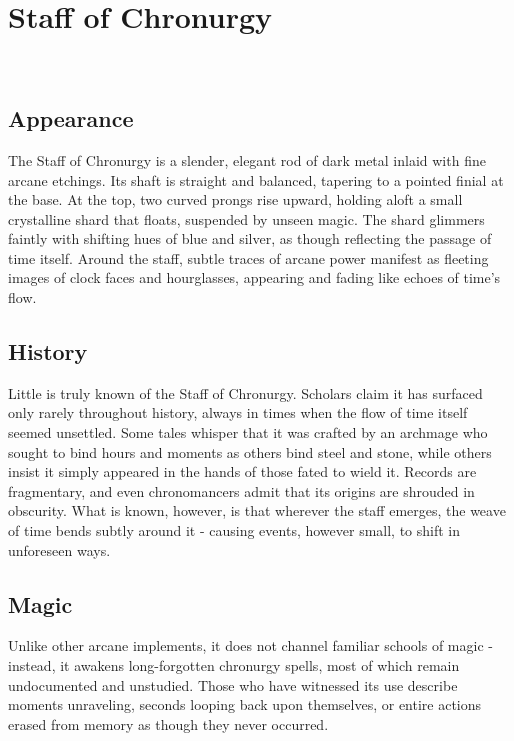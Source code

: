 \ItemCategory{}
\ItemSubCategory{}
\ItemFolder{}

\chapter*{Staff of Chronurgy}
\\

%

\section*{Appearance}
{\entryfont The Staff of Chronurgy is a slender, elegant rod of dark metal inlaid with fine arcane etchings. Its shaft is straight and balanced, tapering to a pointed finial at the base. At the top, two curved prongs rise upward, holding aloft a small crystalline shard that floats, suspended by unseen magic. The shard glimmers faintly with shifting hues of blue and silver, as though reflecting the passage of time itself. Around the staff, subtle traces of arcane power manifest as fleeting images of clock faces and hourglasses, appearing and fading like echoes of time's flow.}
\section*{History}
{\entryfont Little is truly known of the Staff of Chronurgy. Scholars claim it has surfaced only rarely throughout history, always in times when the flow of time itself seemed unsettled. Some tales whisper that it was crafted by an archmage who sought to bind hours and moments as others bind steel and stone, while others insist it simply appeared in the hands of those fated to wield it. Records are fragmentary, and even chronomancers admit that its origins are shrouded in obscurity. What is known, however, is that wherever the staff emerges, the weave of time bends subtly around it - causing events, however small, to shift in unforeseen ways.}
\section*{Magic}
{\entryfont Unlike other arcane implements, it does not channel familiar schools of magic - instead, it awakens long-forgotten chronurgy spells, most of which remain undocumented and unstudied. Those who have witnessed its use describe moments unraveling, seconds looping back upon themselves, or entire actions erased from memory as though they never occurred.}
\vfill\eject
